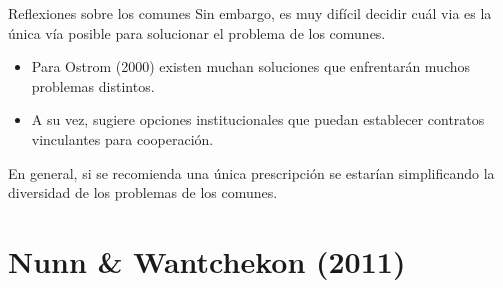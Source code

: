 \documentclass[11pt, aspectratio=169, compress]{beamer}
\begin{document}
\begin{frame}{Reflexiones sobre los comunes}
	Sin embargo, es muy difícil decidir cuál via es la única vía posible para solucionar el problema de los comunes. 
	\begin{itemize}
		\item Para Ostrom (2000) existen muchan soluciones que enfrentarán muchos problemas distintos. 
		\item A su vez, sugiere opciones institucionales que puedan establecer contratos vinculantes para cooperación. 
	\end{itemize}
	En general, si se recomienda una única prescripción se estarían simplificando la diversidad de los problemas de los comunes. 
\end{frame}
\section{Nunn \& Wantchekon (2011)}
\end{document}
